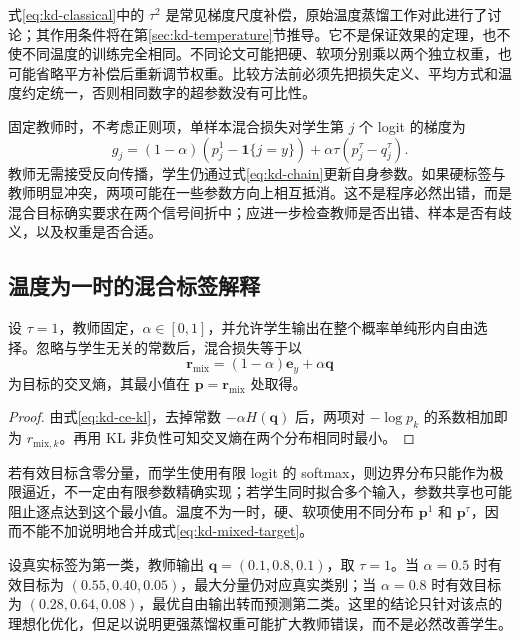\documentclass[UTF8,12pt,a4paper,fontset=fandol]{ctexart}
\begin{document}
式\eqref{eq:kd-classical}中的 $\tau^2$ 是常见梯度尺度补偿，原始温度蒸馏工作对此进行了讨论\cite{hinton2015}；其作用条件将在第\ref{sec:kd-temperature}节推导。它不是保证效果的定理，也不使不同温度的训练完全相同。不同论文可能把硬、软项分别乘以两个独立权重，也可能省略平方补偿后重新调节权重。比较方法前必须先把损失定义、平均方式和温度约定统一，否则相同数字的超参数没有可比性。

固定教师时，不考虑正则项，单样本混合损失对学生第 $j$ 个 logit 的梯度为
\begin{equation}
 g_j=(1-\alpha)(p_j^1-\mathbf1\{j=y\})
       +\alpha\tau(p_j^\tau-q_j^\tau).
 \label{eq:kd-total-gradient}
\end{equation}
教师无需接受反向传播，学生仍通过式\eqref{eq:kd-chain}更新自身参数。如果硬标签与教师明显冲突，两项可能在一些参数方向上相互抵消。这不是程序必然出错，而是混合目标确实要求在两个信号间折中；应进一步检查教师是否出错、样本是否有歧义，以及权重是否合适。

\subsection{温度为一时的混合标签解释}
\begin{proposition}[固定样本的有效目标]
设 $\tau=1$，教师固定，$\alpha\in[0,1]$，并允许学生输出在整个概率单纯形内自由选择。忽略与学生无关的常数后，混合损失等于以
\begin{equation}
 \mathbf r_{\mathrm{mix}}=(1-\alpha)\mathbf e_y+\alpha\mathbf q
 \label{eq:kd-mixed-target}
\end{equation}
为目标的交叉熵，其最小值在 $\mathbf p=\mathbf r_{\mathrm{mix}}$ 处取得。
\end{proposition}
\begin{proof}
由式\eqref{eq:kd-ce-kl}，去掉常数 $-\alpha H(\mathbf q)$ 后，两项对 $-\log p_k$ 的系数相加即为 $r_{\mathrm{mix},k}$。再用 KL 非负性可知交叉熵在两个分布相同时最小。
\end{proof}

若有效目标含零分量，而学生使用有限 logit 的 softmax，则边界分布只能作为极限逼近，不一定由有限参数精确实现；若学生同时拟合多个输入，参数共享也可能阻止逐点达到这个最小值。温度不为一时，硬、软项使用不同分布 $\mathbf p^1$ 和 $\mathbf p^\tau$，因而不能不加说明地合并成式\eqref{eq:kd-mixed-target}。

\begin{example}[教师犯错时标签权重的作用]
设真实标签为第一类，教师输出 $\mathbf q=(0.1,0.8,0.1)$，取 $\tau=1$。当 $\alpha=0.5$ 时有效目标为 $(0.55,0.40,0.05)$，最大分量仍对应真实类别；当 $\alpha=0.8$ 时有效目标为 $(0.28,0.64,0.08)$，最优自由输出转而预测第二类。这里的结论只针对该点的理想化优化，但足以说明更强蒸馏权重可能扩大教师错误，而不是必然改善学生。
\end{example}
\end{document}
